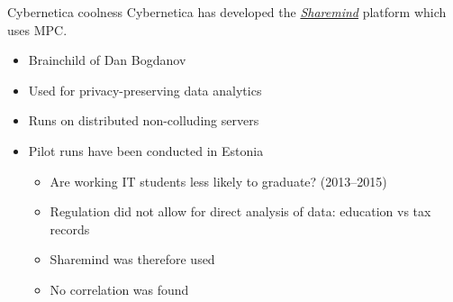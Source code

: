 \begin{frame}{Cybernetica coolness}
  Cybernetica has developed the \href{https://sharemind.cyber.ee}{\textit{Sharemind}} platform which uses MPC.
  \begin{itemize}[<+(1)->]
    \item Brainchild of Dan Bogdanov
    \item Used for privacy-preserving data analytics
    \item Runs on distributed non-colluding servers
    \item Pilot runs have been conducted in Estonia
    \begin{itemize}
      \item Are working IT students less likely to graduate? (2013--2015)
      \item Regulation did not allow for direct analysis of data: education vs tax records
      \item Sharemind was therefore used 
      \item No correlation was found
    \end{itemize}
  \end{itemize}
\end{frame}


